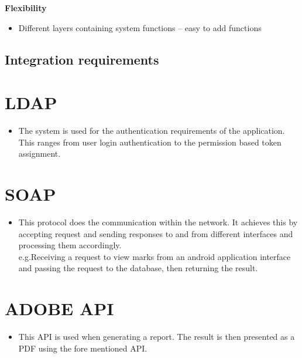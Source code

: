 \documentclass[10pt,a4paper]{article}
\begin{document}
\begin{center}\textbf{Flexibility}\end{center}           
        \begin{itemize}
                \item Different layers containing system functions – easy to add functions
        \end{itemize}   


\subsection{Integration requirements}
	\section*{LDAP}
    \begin{itemize}
                \item The system is used for the authentication requirements of the application.\\This ranges from user login authentication to the permission based token assignment.
    \end{itemize}
    
	\section*{SOAP}
    \begin{itemize}
                \item This protocol does the communication within the network. It achieves this by accepting request and sending responses to and from different interfaces and processing them accordingly.\\e.g.Receiving a request to view marks from an android application interface and passing the request to the database, then returning the result.  
    \end{itemize}   
    
	\section*{ADOBE API}
    \begin{itemize}
                \item This API is used when generating a report. The result is then presented as a PDF using the fore mentioned API. 
    \end{itemize}   
\end{document}
